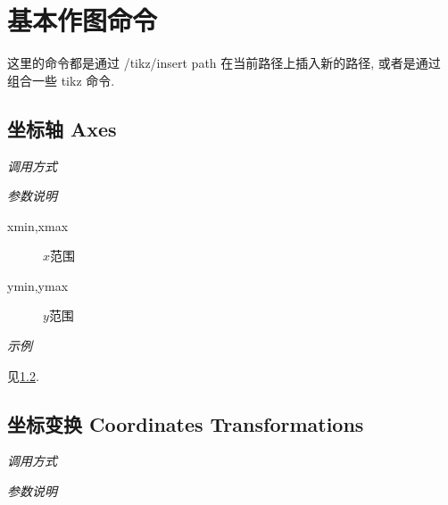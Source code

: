 \chapter{基本作图命令}

这里的命令都是通过 /tikz/insert path\cite{PATH} 在当前路径上插入新的路径, 或者是通过  组合一些 tikz 命令.

\section{坐标轴 Axes}

\emph{调用方式}

\begin{tcolorbox}{}
\end{tcolorbox}

\emph{参数说明}

\begin{description}
  \item[xmin,xmax] $x$范围
  \item[ymin,ymax] $y$范围
\end{description}

\emph{示例}

见\ref{sec:transform}.

\section{坐标变换 Coordinates Transformations}\label{sec:transform}

\emph{调用方式}

\begin{tcolorbox}{}
\end{tcolorbox}

\emph{参数说明}

